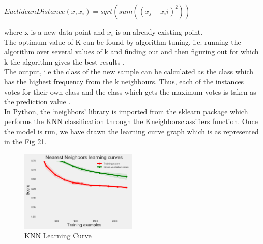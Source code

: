 $EuclideanDistance(x, x_i) = sqrt( sum( (x_j-x_ii)^2 ) )$

where x is a new data point and $x_i$ is an already existing point.\\
The optimum value of K can be found by algorithm tuning, i.e. running the algorithm over several values of k and finding out and then figuring out for which k the algorithm gives the best results \cite{link12}.\\
The output, i.e the class of the new sample can be calculated as the class which has the highest frequency from the k neighbours. Thus, each of the instances votes for their own class and the class which gets the maximum votes is taken as the prediction value \cite{link12}. \\
In Python, the `neighbors' library is imported from the sklearn package which performs the KNN classification through the Kneighborsclassifiers function. Once the model is run, we have drawn the learning curve graph which is as represented in the Fig 21. 

\begin{figure}[h]
\caption{KNN Learning Curve}
\label{5.2}
\centering
\includegraphics[width=0.5\textwidth]{images/5_2.png}
\end{figure}

